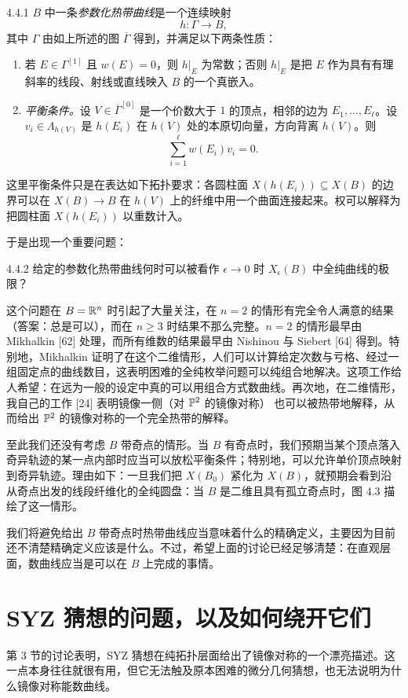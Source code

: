 \begin{definition}{4.4.1}
$B$ 中一条\emph{参数化热带曲线}是一个连续映射
\[
h:\Gamma\to B,
\]
其中 $\Gamma$ 由如上所述的图 $\overline{\Gamma}$ 得到，并满足以下两条性质：
\begin{enumerate}
\item 若 $E\in\Gamma^{[1]}$ 且 $w(E)=0$，则 $h|_E$ 为常数；否则 $h|_E$ 是把 $E$ 作为具有有理斜率的线段、射线或直线映入 $B$ 的一个真嵌入。
\item \emph{平衡条件。}设 $V\in\overline{\Gamma}^{[0]}$ 是一个价数大于 $1$ 的顶点，相邻的边为 $E_1,\dots,E_\ell$。设 $v_i\in\Lambda_{h(V)}$ 是 $h(E_i)$ 在 $h(V)$ 处的本原切向量，方向背离 $h(V)$。则
\[
\sum_{i=1}^{\ell}w(E_i)v_i=0.
\]
\end{enumerate}
\end{definition}

这里平衡条件只是在表达如下拓扑要求：各圆柱面 $X(h(E_i))\subseteq X(B)$ 的边界可以在 $X(B)\to B$ 在 $h(V)$ 上的纤维中用一个曲面连接起来。权可以解释为把圆柱面 $X(h(E_i))$ 以重数计入。

于是出现一个重要问题：

\begin{question}{4.4.2}
给定的参数化热带曲线何时可以被看作 $\epsilon\to0$ 时 $X_\epsilon(B)$ 中全纯曲线的极限？
\end{question}

这个问题在 $B=\mathbb{R}^n$ 时引起了大量关注，在 $n=2$ 的情形有完全令人满意的结果（答案：总是可以），而在 $n\ge3$ 时结果不那么完整。$n=2$ 的情形最早由 Mikhalkin [62] 处理，而所有维数的结果最早由 Nishinou 与 Siebert [64] 得到。特别地，Mikhalkin 证明了在这个二维情形，人们可以计算给定次数与亏格、经过一组固定点的曲线数目，这表明困难的全纯枚举问题可以纯组合地解决。这项工作给人希望：在远为一般的设定中真的可以用组合方式数曲线。再次地，在二维情形，我自己的工作 [24] 表明镜像一侧（对 $\mathbb{P}^2$ 的镜像对称）
也可以被热带地解释，从而给出 $\mathbb{P}^2$ 的镜像对称的一个完全热带的解释。

至此我们还没有考虑 $B$ 带奇点的情形。当 $B$ 有奇点时，我们预期当某个顶点落入奇异轨迹的某一点内部时应当可以放松平衡条件；特别地，可以允许单价顶点映射到奇异轨迹。理由如下：一旦我们把 $X(B_0)$ 紧化为 $X(B)$，就预期会看到沿从奇点出发的线段纤维化的全纯圆盘：当 $B$ 是二维且具有孤立奇点时，图 4.3 描绘了这一情形。

我们将避免给出 $B$ 带奇点时热带曲线应当意味着什么的精确定义，主要因为目前还不清楚精确定义应该是什么。不过，希望上面的讨论已经足够清楚：在直观层面，数曲线应当是可以在 $B$ 上完成的事情。

\section{SYZ 猜想的问题，以及如何绕开它们}
第 3 节的讨论表明，SYZ 猜想在纯拓扑层面给出了镜像对称的一个漂亮描述。这一点本身往往就很有用，但它无法触及原本困难的微分几何猜想，也无法说明为什么镜像对称能数曲线。
